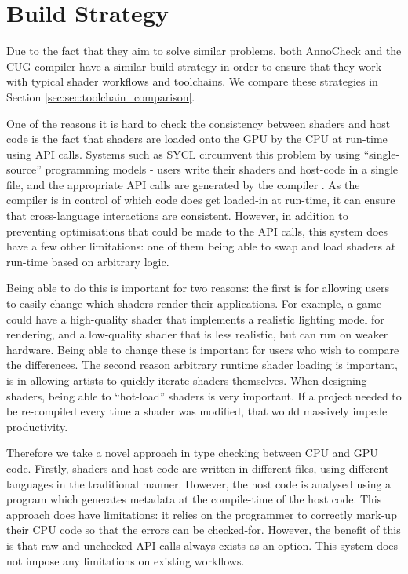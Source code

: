 \documentclass[a4paper,12pt,twoside,openright]{report}
\begin{document}
\section{Build Strategy}

Due to the fact that they aim to solve similar problems, both AnnoCheck and the
CUG compiler have a similar build strategy in order to ensure that they work
with typical shader workflows and toolchains. We compare these strategies in
Section \ref{sec:sec:toolchain_comparison}.

One of the reasons it is hard to check the consistency between shaders and host
code is the fact that shaders are loaded onto the GPU by the CPU at run-time
using API calls. Systems such as SYCL circumvent this problem by using
``single-source'' programming models - users write their shaders and host-code
in a single file, and the appropriate API calls are generated by the compiler
\cite{TODO}. As the compiler is in control of which code does get loaded-in at
run-time, it can ensure that cross-language interactions are consistent.
However, in addition to preventing optimisations that could be made to the API
calls, this system does have a few other limitations: one of them being able to
swap and load shaders at run-time based on arbitrary logic.

Being able to do this is important for two reasons: the first is for allowing
users to easily change which shaders render their applications. For example, a
game could have a high-quality shader that implements a realistic lighting
model for rendering, and a low-quality shader that is less realistic, but can
run on weaker hardware. Being able to change these is important for users who
wish to compare the differences. The second reason arbitrary runtime shader
loading is important, is in allowing artists to quickly iterate shaders
themselves. When designing shaders, being able to ``hot-load'' shaders is very
important. If a project needed to be re-compiled every time a shader was
modified, that would massively impede productivity.

Therefore we take a novel approach in type checking between CPU and GPU code.
Firstly, shaders and host code are written in different files, using different
languages in the traditional manner. However, the host code is analysed using a
program which generates metadata at the compile-time of the host code. This
approach does have limitations: it relies on the programmer to correctly
mark-up their CPU code so that the errors can be checked-for. However, the
benefit of this is that raw-and-unchecked API calls always exists as an option.
This system does not impose any limitations on existing workflows.
\end{document}
